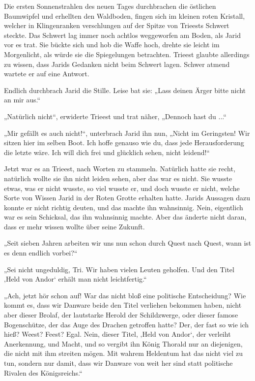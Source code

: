 Die ersten Sonnenstrahlen des neuen Tages durchbrachen die östlichen Baumwipfel und erhellten den Waldboden, fingen sich im kleinen roten Kristall, welcher in Klingenranken verschlungen auf der Spitze von Trieests Schwert steckte. Das Schwert lag immer noch achtlos weggeworfen am Boden, als Jarid vor es trat. Sie bückte sich und hob die Waffe hoch, drehte sie leicht im Morgenlicht, als würde sie die Spiegelungen betrachten. Trieest glaubte allerdings zu wissen, dass Jarids Gedanken nicht beim Schwert lagen. Schwer atmend wartete er auf eine Antwort.

Endlich durchbrach Jarid die Stille. Leise bat sie: „Lass deinen Ärger bitte nicht an mir aus.“

„Natürlich nicht“, erwiderte Trieest und trat näher, „Dennoch hast du ...“

„Mir gefällt es auch nicht!“, unterbrach Jarid ihn nun, „Nicht im Geringsten! Wir sitzen hier im selben Boot. Ich hoffe genauso wie du, dass jede Herausforderung die letzte wäre. Ich will dich frei und glücklich sehen, nicht leidend!“

Jetzt war es an Trieest, nach Worten zu stammeln. Natürlich hatte sie recht, natürlich wollte sie ihn nicht leiden sehen, aber das war es nicht. Sie wusste etwas, was er nicht wusste, so viel wusste er, und doch wusste er nicht, welche Sorte von Wissen Jarid in der Roten Grotte erhalten hatte. Jarids Aussagen dazu konnte er nicht richtig deuten, und das machte ihn wahnsinnig. Nein, eigentlich war es sein Schicksal, das ihn wahnsinnig machte. Aber das änderte nicht daran, dass er mehr wissen wollte über seine Zukunft.

„Seit sieben Jahren arbeiten wir uns nun schon durch Quest nach Quest, wann ist es denn endlich vorbei?“

„Sei nicht ungeduldig, Tri. Wir haben vielen Leuten geholfen. Und den Titel ‚Held von Andor‘ erhält man nicht leichtfertig.“

„Ach, jetzt hör schon auf! War das nicht bloß eine politische Entscheidung? Wie kommt es, dass wir Danware beide den Titel verliehen bekommen haben, nicht aber dieser Brolaf, der lautstarke Herold der Schildzwerge, oder dieser famose Bogenschütze, der das Auge des Drachen getroffen hatte? Der, der fast so wie ich hieß? Weest? Feest? Egal. Nein, dieser Titel, ‚Held von Andor‘, der verleiht Anerkennung, und Macht, und so vergibt ihn König Thorald nur an diejenigen, die nicht mit ihm streiten mögen. Mit wahrem Heldentum hat das nicht viel zu tun, sondern nur damit, dass wir Danware von weit her sind statt politische Rivalen des Königsreichs.“


